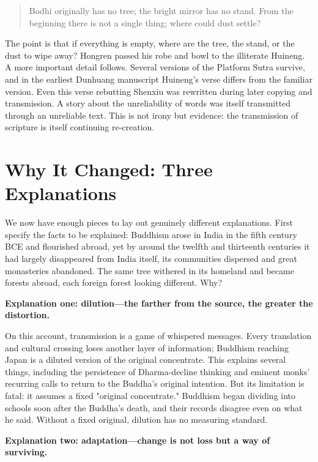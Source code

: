 \begin{quote}
Bodhi originally has no tree; the bright mirror has no stand. From the beginning there is not a single thing; where could dust settle?
\end{quote}
The point is that if everything is empty, where are the tree, the stand, or the dust to wipe away? Hongren passed his robe and bowl to the illiterate Huineng. A more important detail follows. Several versions of the Platform Sutra survive, and in the earliest Dunhuang manuscript Huineng's verse differs from the familiar version. Even this verse rebutting Shenxiu was rewritten during later copying and transmission. A story about the unreliability of words was itself transmitted through an unreliable text. This is not irony but evidence: the transmission of scripture is itself continuing re-creation.

\section{Why It Changed: Three Explanations}
We now have enough pieces to lay out genuinely different explanations. First specify the facts to be explained: Buddhism arose in India in the fifth century BCE and flourished abroad, yet by around the twelfth and thirteenth centuries it had largely disappeared from India itself, its communities dispersed and great monasteries abandoned. The same tree withered in its homeland and became forests abroad, each foreign forest looking different. Why?

\textbf{Explanation one: dilution---the farther from the source, the greater the distortion.}

On this account, transmission is a game of whispered messages. Every translation and cultural crossing loses another layer of information; Buddhism reaching Japan is a diluted version of the original concentrate. This explains several things, including the persistence of Dharma-decline thinking and eminent monks' recurring calls to return to the Buddha's original intention. But its limitation is fatal: it assumes a fixed "original concentrate." Buddhism began dividing into schools soon after the Buddha's death, and their records disagree even on what he said. Without a fixed original, dilution has no measuring standard.

\textbf{Explanation two: adaptation---change is not loss but a way of surviving.}

